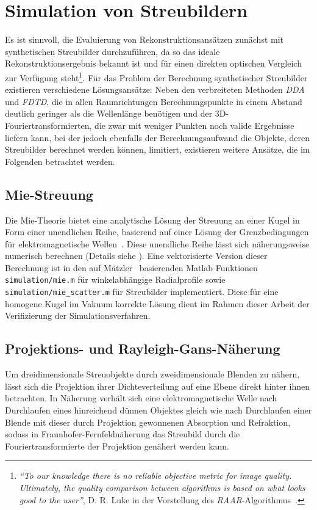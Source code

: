 \chapter{Simulation von Streubildern}
Es ist sinnvoll, die Evaluierung von Rekonstruktionsansätzen zunächst mit synthetischen Streubilder durchzuführen, da so das ideale Rekonstruktionsergebnis bekannt ist und für einen direkten optischen Vergleich zur Verfügung steht\footnote{\textit{"`To our
	knowledge there is no reliable objective metric for image quality. Ultimately, the quality
	comparison between algorithms is based on what looks good to the user"'}, D. R. Luke in der Vorstellung des \textit{RAAR}-Algorithmus~\cite{luke2004}.}. 
Für das Problem der Berechnung synthetischer Streubilder existieren verschiedene Lösungsansätze: Neben den verbreiteten Methoden \textit{DDA} und \textit{FDTD}, die in allen Raumrichtungen Berechnungspunkte in einem Abstand deutlich geringer als die Wellenlänge benötigen und der 3D-Fouriertransformierten, die zwar mit weniger Punkten noch valide Ergebnisse liefern kann, bei der jedoch ebenfalls der Berechnungsaufwand die Objekte, deren Streubilder berechnet werden können, limitiert, existieren weitere Ansätze, die im Folgenden betrachtet werden.

\section{Mie-Streuung}
Die Mie-Theorie bietet eine analytische Lösung der Streuung an einer Kugel in Form einer unendlichen Reihe, basierend auf einer Lösung der Grenzbedingungen für elektromagnetische Wellen~\cite{bohren2008}. Diese unendliche Reihe lässt sich näherungsweise numerisch berechnen (Details siehe ).
Eine vektorisierte Version dieser Berechnung ist in den auf Mätzler~\cite{maetzler2002} basierenden Matlab Funktionen \texttt{simulation/mie.m} für winkelabhängige Radialprofile sowie \texttt{simulation/mie\_scatter.m} für Streubilder implementiert. Diese für eine homogene Kugel im Vakuum korrekte Lösung dient im Rahmen dieser Arbeit der Verifizierung der Simulationsverfahren.

\section{Projektions- und Rayleigh-Gans-Näherung}
	
Um dreidimensionale Streuobjekte durch zweidimensionale Blenden zu nähern, lässt sich die Projektion ihrer Dichteverteilung auf eine Ebene direkt hinter ihnen betrachten. In Näherung verhält sich eine elektromagnetische Welle nach Durchlaufen eines hinreichend dünnen Objektes gleich wie nach Durchlaufen einer Blende mit dieser durch Projektion gewonnenen Absorption und Refraktion, sodass in Fraunhofer-Fernfeldnäherung das Streubild durch die Fouriertransformierte der Projektion genähert werden kann.
	
